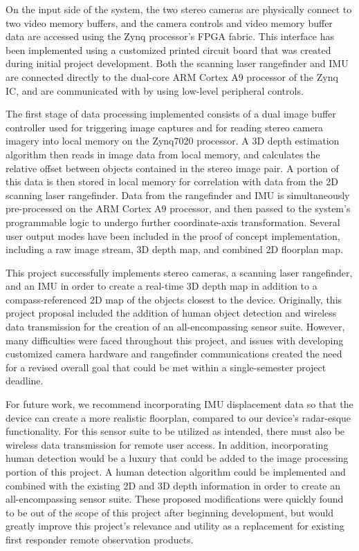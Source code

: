 \par
On the input side of the system, the two stereo cameras are physically connect to two video memory buffers, and the camera controls and video memory buffer data are accessed using the Zynq processor's FPGA fabric. This interface has been implemented using a customized printed circuit board that was created during initial project development. Both the scanning laser rangefinder and IMU are connected directly to the dual-core ARM Cortex A9 processor of the Zynq IC, and are communicated with by using low-level peripheral controls. 
\par
The first stage of data processing implemented consists of a dual image buffer controller used for triggering image captures and for reading stereo camera imagery into local memory on the Zynq7020 processor. A 3D depth estimation algorithm then reads in image data from local memory, and calculates the relative offset between objects contained in the stereo image pair. A portion of this data is then stored in local memory for correlation with data from the 2D scanning laser rangefinder. Data from the rangefinder and IMU is simultaneously pre-processed on the ARM Cortex A9 processor, and then passed to the system's programmable logic to undergo further coordinate-axis transformation. Several user output modes have been included in the proof of concept implementation, including a raw image stream, 3D depth map, and combined 2D floorplan map.  
\par
This project successfully implements stereo cameras, a scanning laser rangefinder, and an IMU in order to create a real-time 3D depth map in addition to a compass-referenced 2D map of the objects closest to the device. Originally, this project proposal included the addition of human object detection and wireless data transmission for the creation of an all-encompassing sensor suite. However, many difficulties were faced throughout this project, and issues with developing customized camera hardware and rangefinder communications created the need for a revised overall goal that could be met within a single-semester project deadline.
\par
For future work, we recommend incorporating IMU displacement data so that the device can create a more realistic floorplan, compared to our device's radar-esque functionality. For this sensor suite to be utilized as intended, there must also be wireless data transmission for remote user access. In addition, incorporating human detection would be a luxury that could be added to the image processing portion of this project. A human detection algorithm could be implemented and combined with the existing 2D and 3D depth information in order to create an all-encompassing sensor suite. These proposed modifications were quickly found to be out of the scope of this project after beginning development, but would greatly improve this project's relevance and utility as a replacement for existing first responder remote observation products.
